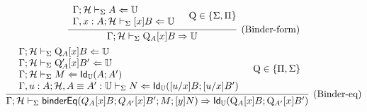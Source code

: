 \documentclass{amsart}
\begin{document}
\begin{gather*}
  \infer[\text{(Binder-form)}]{
    \Gamma;\mathcal{H}\vdash_\Sigma\mathrm{Q}_A[x]B\infers\uni
  }{
    \begin{array}{l}
      \Gamma;\mathcal{H}\vdash_\Sigma A \checks\uni\\
      \Gamma,x:A;\mathcal{H}\vdash_\Sigma [x]B\checks\uni
    \end{array} &
    \mathrm{Q} \in \{ \Sigma, \Pi \}
  }
  \\
  \infer[\text{(Binder-eq)}]{
    \Gamma;\mathcal{H}\vdash_\Sigma \mathsf{binderEq}(Q_A[x]B; Q_{A'}[x]B'; M; [y]N) \infers \mathsf{Id}_\uni(\mathrm{Q}_A[x]B;\mathrm{Q}_{A'}[x]B')
  }{
    \begin{array}{l}
      \Gamma;\mathcal{H}\vdash_\Sigma \mathrm{Q}_A[x]B \checks\uni\\
      \Gamma;\mathcal{H}\vdash_\Sigma \mathrm{Q}_A'[x]B' \checks\uni\\
      \Gamma;\mathcal{H}\vdash_\Sigma M \checks \mathsf{Id}_\uni(A; A')\\
      \Gamma,u:A;\mathcal{H},A\equiv A':\uni \vdash_\Sigma N\checks \mathsf{Id}_\uni([u/x]B; [u/x]B')
    \end{array}&
    \mathrm{Q}\in\{\Pi,\Sigma\}
  }
\end{gather*}
\end{document}
